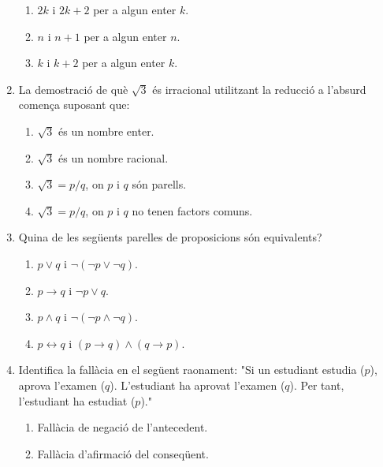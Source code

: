 \begin{enumerate}
\begin{enumerate}
\item $2k$ i $2k+2$ per a algun enter $k$.

\item $n$ i $n+1$ per a algun enter $n$.

\item $k$ i $k+2$ per a algun enter $k$.
\end{enumerate}

\item La demostraci\'{o} de qu\`{e} $\sqrt{3}$ \'{e}s irracional utilitzant la
reducci\'{o} a l'absurd comen\c{c}a suposant que:

\begin{enumerate}
\item $\sqrt{3}$ \'{e}s un nombre enter.

\item $\sqrt{3{}}$ \'{e}s un nombre racional.

\item $\sqrt{3{}}=p/q$, on $p$ i $q$ s\'{o}n parells.

\item $\sqrt{3{}}=p/q$, on $p$ i $q$ no tenen factors comuns.
\end{enumerate}

\item Quina de les seg\"{u}ents parelles de proposicions s\'{o}n equivalents?

\begin{enumerate}
\item $p\vee q$ i $\lnot(\lnot p\vee\lnot q)$.

\item $p\rightarrow q$ i $\lnot p\vee q$.

\item $p\wedge q$ i $\lnot(\lnot p\wedge\lnot q)$.

\item $p\leftrightarrow q$ i $(p\rightarrow q)\wedge(q\rightarrow p)$.
\end{enumerate}

\item Identifica la fal\textperiodcentered l\`{a}cia en el seg\"{u}ent
raonament: "Si un estudiant estudia ($p$), aprova l'examen ($q$). L'estudiant
ha aprovat l'examen ($q$). Per tant, l'estudiant ha estudiat ($p$)."

\begin{enumerate}
\item Fal\textperiodcentered l\`{a}cia de negaci\'{o} de l'antecedent.

\item Fal\textperiodcentered l\`{a}cia d'afirmaci\'{o} del conseq\"{u}ent.


\end{enumerate}
\end{enumerate}
